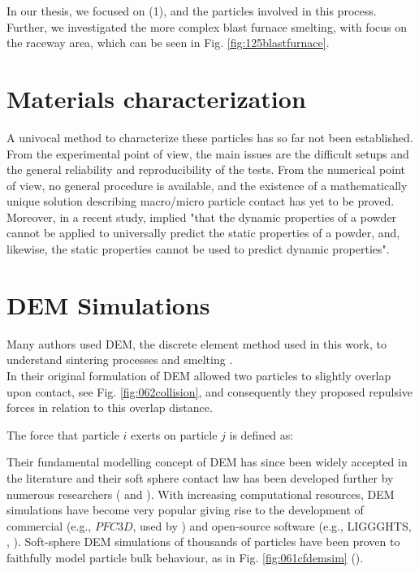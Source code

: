 In our thesis, we focused on (1), and the particles involved in this process.\\
Further, we investigated the more complex blast furnace smelting, with focus on
the raceway area, which can be seen in Fig. \ref{fig:125blastfurnace}.



\section{Materials characterization}
\label{sec:materialscharacterization}

A univocal
method to characterize these particles has so far not been established.
From the experimental point of view, the main issues are the difficult setups and the general 
reliability and reproducibility of the tests. 
From the numerical point of view, no general procedure is available, and the existence of a 
mathematically unique solution describing macro/micro particle contact has yet
to be proved.\\
Moreover, in a recent study, \citet{RefWorks:56} implied "that the dynamic properties of a 
powder cannot be applied to universally predict the static properties of a powder, and, likewise, 
the static properties cannot be used to predict dynamic properties".\\

\section{DEM Simulations}
\label{sec:demsimulations}

Many authors used \acs{DEM}, the discrete
element method used in this work, to understand sintering processes 
\cite{RefWorks:196, RefWorks:197} and smelting \cite{RefWorks:198,
RefWorks:199}.\\
In their original formulation of \acs{DEM} \citet{RefWorks:172} allowed two particles to slightly overlap upon
contact, see Fig. \ref{fig:062collision}, and consequently they proposed
repulsive forces in relation to this overlap distance.

The force that particle $i$ exerts on particle $j$ is defined as:

Their fundamental modelling concept of \acs{DEM} has
since been widely accepted in the literature and their soft sphere contact law has been developed further by
numerous researchers (\citet{RefWorks:148} and \citet{RefWorks:145}).
With increasing computational resources, \acs{DEM} simulations have become very
popular giving rise to the development of commercial (e.g., $PFC3D$, used by
\citet{RefWorks:87}) and open-source software (e.g.,
\acs{LIGGGHTS}, \citet{RefWorks:136}, \citet{RefWorks:139}).
Soft-sphere \acs{DEM} simulations of thousands of particles have been proven to 
faithfully model particle bulk behaviour, as in Fig. \ref{fig:061cfdemsim}
(\citet{RefWorks:86}).\\
 


